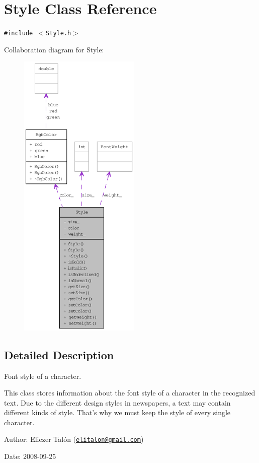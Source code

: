 \hypertarget{class_style}{
\section{Style Class Reference}
\label{class_style}
}
{\tt \#include $<$Style.h$>$}

Collaboration diagram for Style:\nopagebreak
\begin{figure}[H]
\begin{center}
\leavevmode
\includegraphics[height=400pt]{class_style__coll__graph}
\end{center}
\end{figure}


\subsection{Detailed Description}
Font style of a character. 

This class stores information about the font style of a character in the recognized text. Due to the different design styles in newspapers, a text may contain different kinds of style. That's why we must keep the style of every single character.

\begin{Desc}
\item[Author:]Eliezer Talón (\href{mailto:elitalon@gmail.com}{\tt elitalon@gmail.com}) \end{Desc}
\begin{Desc}
\item[Date:]2008-09-25 \end{Desc}


